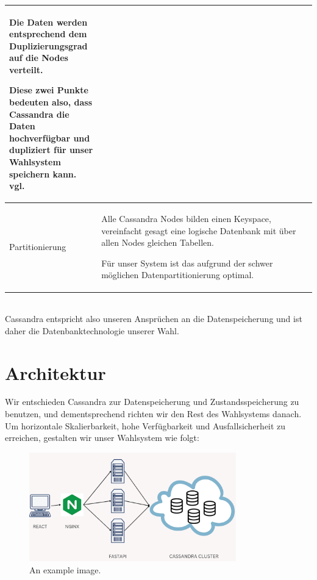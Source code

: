 \documentclass{article}  %
\begin{document}
\begin{tabular}{  p{0.3\linewidth} | p{0.8\linewidth} }
    Die Daten werden entsprechend dem Duplizierungsgrad auf die Nodes verteilt.
    
    \vspace{1em}
    
    Diese zwei Punkte bedeuten also, dass Cassandra die Daten hochverfügbar und dupliziert für unser Wahlsystem speichern kann.
    vgl. \cite{overview}
    \\

      \hline
      Partitionierung & 
      
      Alle Cassandra Nodes bilden einen Keyspace, vereinfacht gesagt eine logische Datenbank mit über allen Nodes gleichen Tabellen. 

      Für unser System ist das aufgrund der schwer möglichen Datenpartitionierung optimal.
      \cite{overview}
      \\   
    \end{tabular}
    \\
    Cassandra entspricht also unseren Ansprüchen an die Datenspeicherung und ist daher die Datenbanktechnologie unserer Wahl.
\newpage
\section{Architektur}
Wir entschieden Cassandra zur Datenspeicherung und Zustandsspeicherung zu benutzen, und dementsprechend richten wir den Rest des Wahlsystems danach. \\
Um horizontale Skalierbarkeit, hohe Verfügbarkeit und Ausfallsicherheit zu erreichen, gestalten wir unser Wahlsystem wie folgt: \\

\begin{figure}[h] %
    \centering %
    \includegraphics[width=0.8\textwidth]{architecture} %
    \caption{An example image.} %
    \label{fig:example} %
\end{figure}
\end{document}
